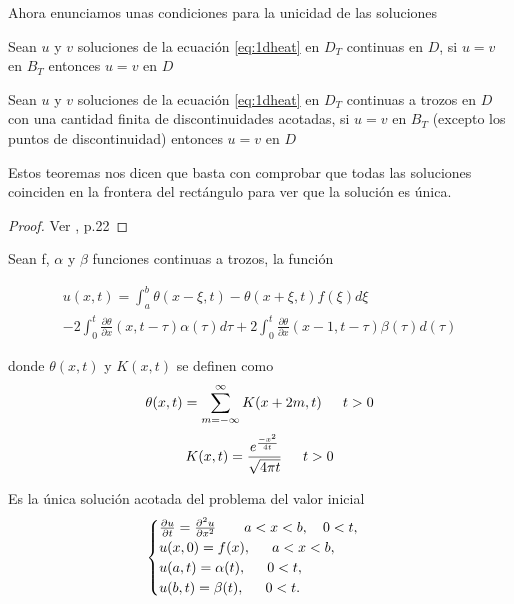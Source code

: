 Ahora enunciamos unas condiciones para la unicidad de las soluciones

\begin{teorema}[Unicidad]
	Sean $u$ y $v$ soluciones de la ecuación \ref{eq:1dheat} en $D_T$ continuas en $D$, si $u=v$ en $B_T$ entonces $u=v$ en $D$
\end{teorema}

\begin{teorema}
	Sean $u$ y $v$ soluciones de la ecuación \ref{eq:1dheat} en $D_T$ continuas a trozos en $D$ con una cantidad finita de discontinuidades acotadas, si $u=v$ en $B_T$ (excepto los puntos de discontinuidad) entonces $u=v$ en $D$
\end{teorema}

Estos teoremas nos dicen que basta con comprobar que todas las soluciones coinciden en la frontera del rectángulo para ver que la solución es única.

\begin{proof}
	Ver \citet{1dheat}, p.22
\end{proof}



\begin{teorema}\label{teo:exis_uni_1dheat}
	Sean f, $\alpha$ y $\beta$ funciones continuas a trozos, la función
	
	\begin{multline}\label{eq:sol1dheat}
		u(x,t) = \int_{a}^{b}\theta(x-\xi,t)-\theta(x+\xi,t)f(\xi)d\xi \\
		- 2\int_{0}^{t}\frac{\partial \theta}{\partial x}(x, t-\tau)\alpha(\tau)d\tau+2\int_{0}^{t}\frac{\partial\theta}{\partial x}(x-1,t-\tau)\beta(\tau)d(\tau)
	\end{multline}
	
	donde $\theta(x,t)$ y $K(x,t)$ se definen como
	\[
		\theta(x,t)=\sum_{m=-\infty}^{\infty}K(x+2m,t) \hspace{15px} t>0
	\]\[
		K(x,t)=\frac{e^{\frac{-x^2}{4t}}}{\sqrt{4\pi t}}\hspace{15px} t>0
	\]
	
	Es la única solución acotada del problema del valor inicial
	\begin{equation}\label{eq:pvi1dheat}
		\begin{cases}
			\frac{\partial u}{\partial t} = \frac{\partial ^2u}{\partial x^2} \hspace{20px}a<x<b, \hspace{10px} 0<t, \\
			u(x,0)=f(x), \hspace{15px} a<x<b, \\
			u(a,t)=\alpha(t), \hspace{15px} 0<t, \\
			u(b,t)=\beta(t), \hspace{15px} 0<t.
		\end{cases}
	\end{equation}
	
\end{teorema}

